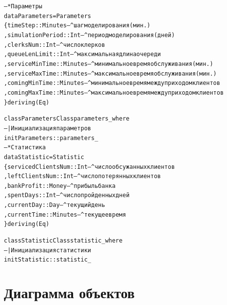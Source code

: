 \documentclass[oneside,final,12pt]{article}
\begin{document}
\begin{alltt}
-- * Параметры
data Parameters = Parameters
\{ timeStep         :: Minutes -- ^ шаг моделирования (мин.)
	, simulationPeriod :: Int     -- ^ период моделирования (дней)
	, clerksNum        :: Int     -- ^ число клерков
	, queueLenLimit    :: Int     -- ^ максимальная длина очереди
	, serviceMinTime   :: Minutes -- ^ минимальное время обслуживания (мин.)
	, serviceMaxTime   :: Minutes -- ^ максимальное время обслуживания (мин.)
	, comingMinTime    :: Minutes -- ^ минимальное время между приходом клиентов
	, comingMaxTime    :: Minutes -- ^ максимальное время между приходом клиентов
\} deriving (Eq)

class ParametersClass parameters_ where
-- | Инициализация параметров
initParameters :: parameters_
 \\

-- * Статистика
data Statistic = Statistic
\{ servicedClientsNum   :: Int     -- ^ число обсужанных клиентов
	, leftClientsNum       :: Int     -- ^ число потерянных клиентов
	, bankProfit           :: Money   -- ^ прибыль банка
	, spentDays            :: Int     -- ^ число пройденных дней
	, currentDay           :: Day     -- ^ текущий день
	, currentTime          :: Minutes -- ^ текущее время
\} deriving (Eq)

class StatisticClass statistic_ where
-- | Инициализация статистики
initStatistic :: statistic_

\end{alltt}
\newpage
\section{Диаграмма объектов}
\end{document}
